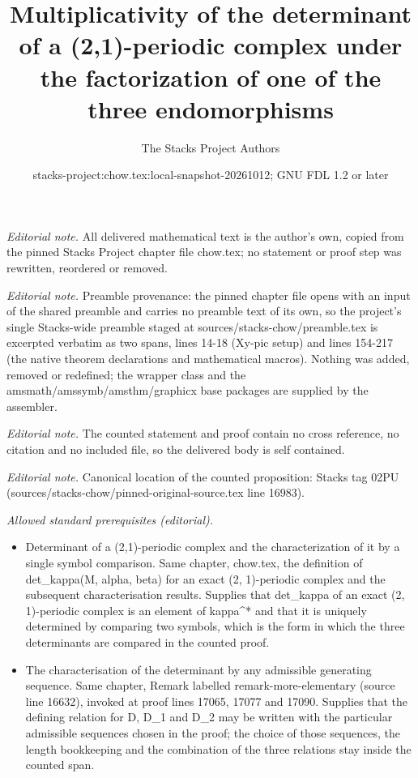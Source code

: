 \documentclass[10pt,a4paper]{amsart}
\title{Multiplicativity of the determinant of a (2,1)-periodic complex under the factorization of one of the three endomorphisms}
\author{The Stacks Project Authors}
\date{stacks-project:chow.tex:local-snapshot-20261012; GNU FDL 1.2 or later}
\theoremstyle{plain}
\theoremstyle{definition}
\theoremstyle{remark}
\numberwithin{equation}{subsection}
\begin{document}
\maketitle
\noindent\textit{Editorial note.} All delivered mathematical text is the author's own, copied from the pinned Stacks Project chapter file chow.tex; no statement or proof step was rewritten, reordered or removed.\par\medskip
\noindent\textit{Editorial note.} Preamble provenance: the pinned chapter file opens with an input of the shared preamble and carries no preamble text of its own, so the project's single Stacks-wide preamble staged at sources/stacks-chow/preamble.tex is excerpted verbatim as two spans, lines 14-18 (Xy-pic setup) and lines 154-217 (the native theorem declarations and mathematical macros). Nothing was added, removed or redefined; the wrapper class and the amsmath/amssymb/amsthm/graphicx base packages are supplied by the assembler.\par\medskip
\noindent\textit{Editorial note.} The counted statement and proof contain no cross reference, no citation and no included file, so the delivered body is self contained.\par\medskip
\noindent\textit{Editorial note.} Canonical location of the counted proposition: Stacks tag 02PU (sources/stacks-chow/pinned-original-source.tex line 16983).\par\medskip
\noindent\textit{Allowed standard prerequisites (editorial).}\begin{itemize}
\item Determinant of a (2,1)-periodic complex and the characterization of it by a single symbol comparison. Same chapter, chow.tex, the definition of det\_kappa(M, alpha, beta) for an exact (2, 1)-periodic complex and the subsequent characterisation results. Supplies that det\_kappa of an exact (2, 1)-periodic complex is an element of kappa\textasciicircum{}* and that it is uniquely determined by comparing two symbols, which is the form in which the three determinants are compared in the counted proof.
\item The characterisation of the determinant by any admissible generating sequence. Same chapter, Remark labelled remark-more-elementary (source line 16632), invoked at proof lines 17065, 17077 and 17090. Supplies that the defining relation for D, D\_1 and D\_2 may be written with the particular admissible sequences chosen in the proof; the choice of those sequences, the length bookkeeping and the combination of the three relations stay inside the counted span.
\end{itemize}\medskip
\end{document}
